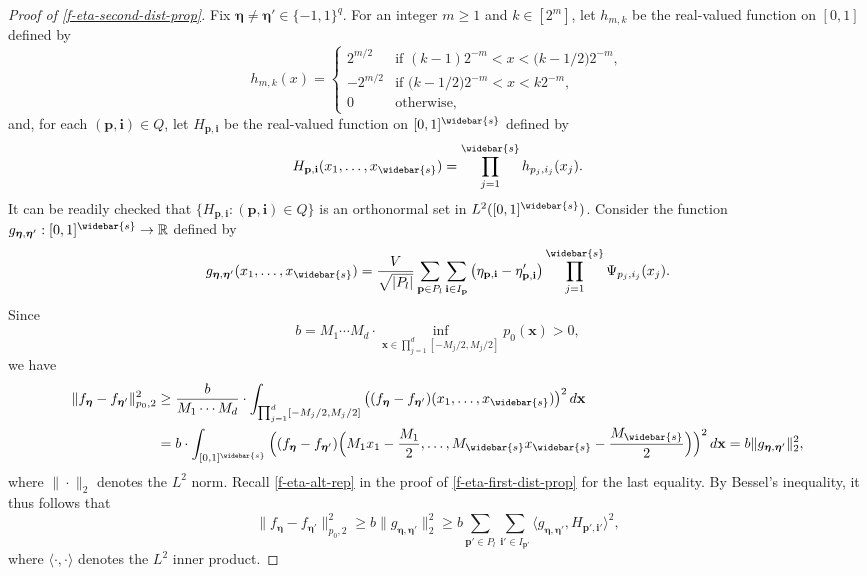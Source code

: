 \documentclass[10pt]{article}
\newcommand{\R}{{\mathbb R}}
\newcommand{\xbf}{{\mathbf{x}}}
\newcommand{\pbf}{{\mathbf{p}}}
\newcommand{\ibf}{{\mathbf{i}}}
\newcommand{\etabf}{{\boldsymbol{\eta}}}
\newcommand\inner[2]{\langle #1, #2 \rangle}
\begin{document}
\begin{proof}[Proof of \eqref{f-eta-second-dist-prop}]    
Fix $\etabf \neq \etabf' \in \{-1, 1\}^q$.
For an integer $m \ge 1$ and $k \in [2^m]$, let $h_{m, k}$ be the 
real-valued function on $[0, 1]$ defined by 
\begin{equation*}
    h_{m, k}(x) = 
    \begin{cases}
        2^{m/2} &\mbox{if } (k - 1)2^{-m} < x
        < \big(k - 1/2\big) 2^{-m}, \\
        -2^{m/2} &\mbox{if } \big(k - 1/2\big)2^{-m} < x
        < k 2^{-m}, \\
        0 &\mbox{otherwise},
    \end{cases}
\end{equation*}
and, for each $(\pbf, \ibf) \in Q$, let 
$H_{\pbf, \ibf}$ be the real-valued function on 
$[0, 1]^{\widebar{s}}$ defined by 
\begin{equation*}
    H_{\pbf, \ibf}(x_1, \dots, x_{\widebar{s}}) 
    = \prod_{j = 1}^{\widebar{s}} h_{p_j, i_j}(x_j).
\end{equation*}
It can be readily checked that 
$\{H_{\pbf, \ibf}: (\pbf, \ibf) \in Q\}$ is an 
orthonormal set in $L^2([0, 1]^{\widebar{s}})$.
Consider the function $g_{\etabf, \etabf'}: [0, 1]^{\widebar{s}} 
\rightarrow \R$ 
defined by
\begin{equation*}
    g_{\etabf, \etabf'}(x_1, \dots, x_{\widebar{s}}) 
    = \frac{V}{\sqrt{|P_l|}} \sum_{\pbf \in P_l} 
    \sum_{\ibf \in I_{\pbf}} 
    \big(\eta_{\pbf, \ibf} 
    - \eta'_{\pbf, \ibf}\big) 
    \prod_{j=1}^{\widebar{s}} \Psi_{p_j, i_j} (x_j).
\end{equation*}
Since 
\begin{equation*}
    b = M_1 \cdots M_d \cdot \inf_{\xbf \in \prod_{j = 1}^d 
    [-M_j/2, M_j/2]} p_0(\xbf) > 0,
\end{equation*}
we have
\begin{equation*}
\begin{aligned} 
    \| f_{\etabf} - f_{\etabf'} \|_{p_0, 2}^2 
    &\ge \frac{b}{M_1 \cdots M_d} \cdot 
    \int_{\prod_{j = 1}^{d} [-M_j/2, M_j/2]} 
    \big((f_{\etabf} - f_{\etabf'})(x_1, \dots, 
    x_{\widebar{s}})\big)^2 \, d\xbf \\
    &= b \cdot \int_{[0, 1]^{\widebar{s}}} 
    \Big((f_{\etabf} - f_{\etabf'})\Big(M_1 x_1 
    - \frac{M_1}{2}, \dots, M_{\widebar{s}} x_{\widebar{s}} 
    - \frac{M_{\widebar{s}}}{2}\Big)\Big)^2 \, d\xbf
    = b \|g_{\etabf, \etabf'}\|_2^2, 
\end{aligned}
\end{equation*}
where $\|\cdot\|_2$ denotes the $L^2$ norm.
Recall \eqref{f-eta-alt-rep} in the proof of 
\eqref{f-eta-first-dist-prop} for the last equality. By Bessel's 
inequality, it thus follows that
\begin{equation}\label{bessel-inequality}
    \| f_{\etabf} - f_{\etabf'} \|_{p_0, 2}^2 
    \ge b \|g_{\etabf, \etabf'}\|_2^2 \ge 
    b\sum_{\pbf' \in P_l} \sum_{\ibf' \in I_{\pbf'}} 
    \inner{g_{\etabf, \etabf'}}{H_{\pbf', \ibf'}}^2,
\end{equation}
where $\inner{\cdot}{\cdot}$ denotes the $L^2$ inner product. 


\end{proof}
\end{document}
